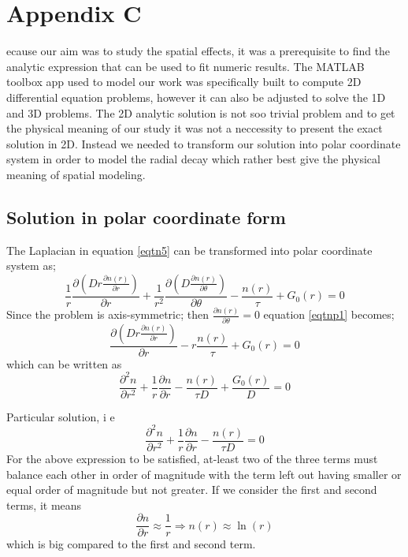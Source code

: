 \chapter{Appendix C}
\label{app:app03}

ecause our aim was to study the spatial effects, it was a prerequisite to find the analytic expression that can be used to fit numeric results. The MATLAB toolbox app used to model our work was specifically built to compute 2D differential equation problems, however it can also be adjusted to solve the 1D and 3D problems. The 2D analytic solution is not soo trivial problem and to get the physical meaning of our study it was not a neccessity to present the exact solution in 2D. Instead we needed to transform our solution into polar coordinate system in order to model the radial decay which rather best give the physical meaning of spatial modeling. 

\section{Solution in polar coordinate form}
The Laplacian in equation \ref{eqtn5}
can be  transformed into polar coordinate system as;
\begin{equation}\label{eqtnp1}  
\frac{1}{r}\frac{\partial(D r\frac{\partial n(r)}{\partial r})}{\partial r} + \frac{1}{r^2}\frac{\partial(D\frac{\partial n(r)}{\partial \theta})}{\partial \theta}  -  \frac{n(r)}{\tau} + G_0(r) = 0
\end{equation}
Since the problem is axis-symmetric; then $\frac{\partial n(r)}{\partial \theta} = 0$ equation \ref{eqtnp1} becomes;
\begin{equation} \label{eqtnp2}
\frac{\partial(Dr\frac{\partial n(r)}{\partial r})}{\partial r} -  r\frac{n(r)}{\tau} + G_0(r) = 0
\end{equation}
which can be written as 
\begin{equation} \label{eqtnp3}
\frac{\partial ^2 n}{\partial r^2} +\frac{1}{r}\frac{\partial n}{\partial r} -  \frac{n(r)}{\tau D} + \frac{G_0(r)}{D} = 0
\end{equation}

Particular solution, i e 
\begin{equation} \label{eqtnp4}
\frac{\partial ^2 n}{\partial r^2} +\frac{1}{r}\frac{\partial n}{\partial r} -  \frac{n(r)}{\tau D} = 0
\end{equation}
For the above expression to be satisfied, at-least two of the three terms must balance each other in order of magnitude with the term left out having smaller or equal order of magnitude but not greater. 
If we consider the first and second terms, it means 
\begin{equation}\label{eqtnp5}
\frac{\partial n}{\partial r} \approx \frac{1}{r}  \Rightarrow  n(r) \approx \ln(r)
\end{equation}
which is big compared to the first and second term.

